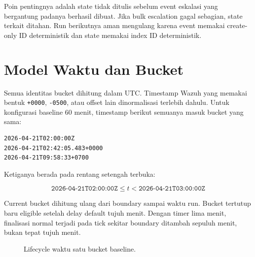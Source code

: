 \documentclass[11pt,a4paper,oneside]{report}
\DeclareRobustCommand{\code}[1]{\nolinkurl{#1}}
\begin{document}
Poin pentingnya adalah state tidak ditulis sebelum event eskalasi yang bergantung
padanya berhasil dibuat. Jika bulk escalation gagal sebagian, state terkait ditahan.
Run berikutnya aman mengulang karena event memakai create-only ID deterministik dan
state memakai index ID deterministik.

\chapter{Model Waktu dan Bucket}

Semua identitas bucket dihitung dalam UTC. Timestamp Wazuh yang memakai bentuk
\code{+0000}, \code{-0500}, atau offset lain dinormalisasi terlebih dahulu.
Untuk konfigurasi baseline 60 menit, timestamp berikut semuanya masuk bucket yang
sama:

\begin{lstlisting}
2026-04-21T02:00:00Z
2026-04-21T02:42:05.483+0000
2026-04-21T09:58:33+0700
\end{lstlisting}

Ketiganya berada pada rentang setengah terbuka:

\[
  \texttt{2026-04-21T02:00:00Z}
  \leq t <
  \texttt{2026-04-21T03:00:00Z}
\]

Current bucket dihitung ulang dari boundary sampai waktu run. Bucket tertutup baru
eligible setelah delay default tujuh menit. Dengan timer lima menit, finalisasi
normal terjadi pada tick sekitar boundary ditambah sepuluh menit, bukan tepat tujuh
menit.

\begin{figure}[ht]
\centering
{}
\caption{Lifecycle waktu satu bucket baseline.}
\end{figure}
\end{document}
